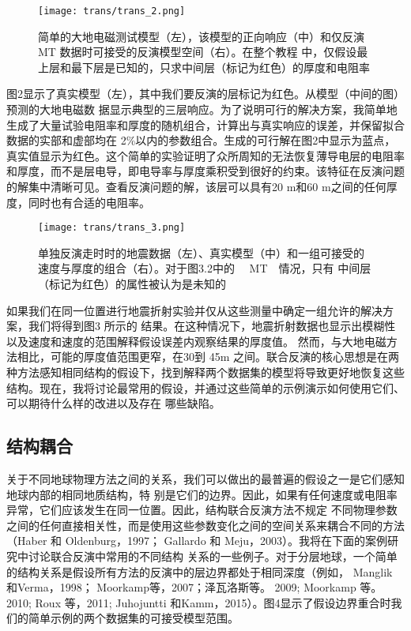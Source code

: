 \begin{figure}
    \centering
    \texttt{[image: trans/trans\_2.png]}
    \caption[]{简单的大地电磁测试模型（左），该模型的正向响应（中）和仅反演 MT 数据时可接受的反演模型空间（右）。在整个教程 中，仅假设最上层和最下层是已知的，只求中间层（标记为红色）的厚度和电阻率}
\end{figure}

图2显示了真实模型（左），其中我们要反演的层标记为红色。从模型（中间的图）预测的大地电磁数 据显示典型的三层响应。为了说明可行的解决方案，我简单地生成了大量试验电阻率和厚度的随机组合，计算出与真实响应的误差，并保留拟合数据的实部和虚部均在 2\%以内的参数组合。生成的可行解在图2中显示为蓝点，真实值显示为红色。这个简单的实验证明了众所周知的无法恢复薄导电层的电阻率和厚度，而不是层电导，即电导率与厚度乘积受到很好的约束。该特征在反演问题的解集中清晰可见。查看反演问题的解，该层可以具有20 m和60 m之间的任何厚度，同时也有合适的电阻率。

\begin{figure}[H]
    \centering
    \texttt{[image: trans/trans\_3.png]}
    \caption[]{单独反演走时时的地震数据（左）、真实模型（中）和一组可接受的速度与厚度的组合（右）。对于图3.2中的   MT  情况，只有 中间层（标记为红色）的属性被认为是未知的}
\end{figure}

如果我们在同一位置进行地震折射实验并仅从这些测量中确定一组允许的解决方案，我们将得到图3 所示的 结果。在这种情况下，地震折射数据也显示出模糊性以及速度和速度的范围解释假设误差内观察结果的厚度值。 然而，与大地电磁方法相比，可能的厚度值范围更窄，在30到 45m 之间。联合反演的核心思想是在两种方法感知相同结构的假设下，找到解释两个数据集的模型将导致更好地恢复这些 结构。现在，我将讨论最常用的假设，并通过这些简单的示例演示如何使用它们、可以期待什么样的改进以及存在 哪些缺陷。

\subsection{结构耦合}

关于不同地球物理方法之间的关系，我们可以做出的最普遍的假设之一是它们感知地球内部的相同地质结构，特 别是它们的边界。因此，如果有任何速度或电阻率异常，它们应该发生在同一位置。因此，结构联合反演方法不规定 不同物理参数之间的任何直接相关性，而是使用这些参数变化之间的空间关系来耦合不同的方法（Haber 和 Oldenburg，1997； Gallardo 和 Meju，2003）。我将在下面的案例研究中讨论联合反演中常用的不同结构 关系的一些例子。对于分层地球，一个简单的结构关系是假设所有方法的反演中的层边界都处于相同深度（例如， Manglik 和Verma，1998； Moorkamp等，2007；泽瓦洛斯等。 2009; Moorkamp 等。2010; Roux 等，2011; Juhojuntti 和Kamm，2015）。图4显示了假设边界重合时我们的简单示例的两个数据集的可接受模型范围。

